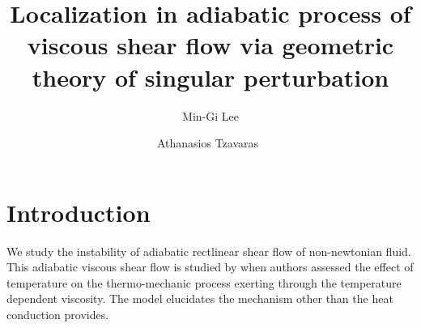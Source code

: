 \documentclass[a4paper,11pt]{article}
\begin{document}
\title{Localization in adiabatic process of viscous shear flow via geometric theory of singular perturbation}
\author{Min-Gi Lee\footnotemark[1] \and Athanasios Tzavaras\footnotemark[1]\  \footnotemark[3]  \footnotemark[4]}
\date{}

\maketitle
\renewcommand{\thefootnote}{\fnsymbol{footnote}}
\renewcommand{\thefootnote}{\arabic{footnote}}


\maketitle

\tableofcontents

\section{Introduction}
We study the instability of adiabatic rectlinear shear flow of non-newtonian fluid. This adiabatic viscous shear flow is studied by \cite{dafermos_adiabatic_1983} when authors assessed the effect of temperature on the thermo-mechanic process exerting through the temperature dependent viscosity. The model elucidates the mechanism other than the heat conduction provides.
\end{document}
